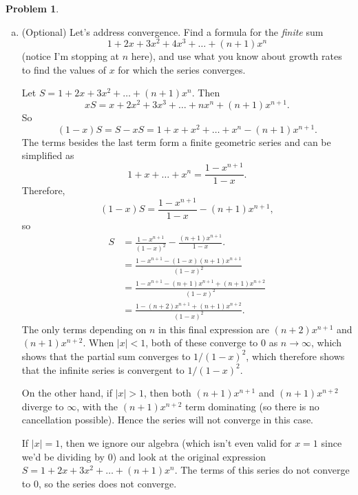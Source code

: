 \documentclass[11pt,oneside]{amsart}
\theoremstyle{definition}
\newtheorem{problem}{Problem}
\theoremstyle{plain}
\begin{document}
\begin{problem}
\begin{enumerate}[(a)]
\begin{solution}
                Here is another proof. This uses the fact that $(n+1)(n+2)/2$ is the sum of the first $n+1$ positive integers (see pset 1, problem 1b!) We can write
                \[\frac 1{(1-x)^3}=\frac 1{(1-x)^2}\frac 1{1-x}=(1+2x+3x^2+4x^3+\dots)(1+x+x^2+x^3+\dots).\]
                By a similar reasoning process as in part (c), the $x^n$ term in the latter product is equal to the sum, over pairs $(a,b)$ of non-negative integers such that $a+b=n$, of $(a+1)x^ax^b$. This is
                \[1\cdot x^0x^n+2\cdot x^1x^{n-1}+3\cdot x^2x^{n-2}+\dots+(n+1)\cdot x^nx^0.\]
                This simplifies to
                \[(1+2+3+\dots+(n+1))x^n=\frac{(n+1)(n+2)}2 x^n.\]
            \end{solution}
            \item (Optional) Let's address convergence. Find a formula for the \emph{finite} sum
            \[1+2x+3x^2+4x^3+\dots+(n+1)x^n\]
            (notice I'm stopping at $n$ here), and use what you know about growth rates to find the values of $x$ for which the series converges.
            \begin{solution}
                Let $S=1+2x+3x^2+\dots+(n+1)x^n$. Then
                \[xS=x+2x^2+3x^3+\dots+nx^n+(n+1)x^{n+1}.\]
                So
                \[(1-x)S=S-xS=1+x+x^2+\dots+x^n-(n+1)x^{n+1}.\]
                The terms besides the last term form a finite geometric series and can be simplified as
                \[1+x+\dots+x^n=\frac{1-x^{n+1}}{1-x}.\]
                Therefore,
                \[(1-x)S=\frac{1-x^{n+1}}{1-x}-(n+1)x^{n+1},\]
                so
                \[\begin{split}
                    S &=\frac{1-x^{n+1}}{(1-x)^2}-\frac{(n+1)x^{n+1}}{1-x}.\\
                    &= \frac{1-x^{n+1}-(1-x)(n+1)x^{n+1}}{(1-x)^2}\\
                    &= \frac{1-x^{n+1}-(n+1)x^{n+1}+(n+1)x^{n+2}}{(1-x)^2} \\
                    &= \frac{1-(n+2)x^{n+1}+(n+1)x^{n+2}}{(1-x)^2}.
                \end{split}\]
                The only terms depending on $n$ in this final expression are $(n+2)x^{n+1}$ and $(n+1)x^{n+2}$. When $|x|<1$, both of these converge to 0 as $n\to\infty$, which shows that the partial sum converges to $1/(1-x)^2$, which therefore shows that the infinite series is convergent to $1/(1-x)^2$.
                
                On the other hand, if $|x| > 1$, then both $(n+1)x^{n+1}$ and $(n+1)x^{n+2}$ diverge to $\infty$, with the $(n+1)x^{n+2}$ term dominating (so there is no cancellation possible). Hence the series will not converge in this case.

                If $|x|=1$, then we ignore our algebra (which isn't even valid for $x=1$ since we'd be dividing by 0) and look at the original expression $S=1+2x+3x^2+\dots+(n+1)x^n$. The terms of this series do not converge to 0, so the series does not converge.
            \end{solution}
        \end{enumerate}
    \end{problem}
\end{document}
